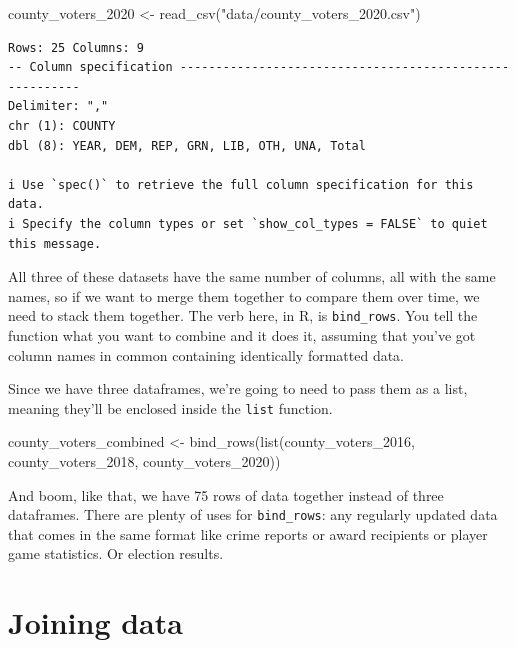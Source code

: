 \documentclass[
  letterpaper,
  DIV=11,
  numbers=noendperiod]{scrreprt}
\newenvironment{Shaded}{\begin{snugshade}}{\end{snugshade}}
\newcommand{\FunctionTok}[1]{\textcolor[rgb]{0.28,0.35,0.67}{#1}}
\newcommand{\NormalTok}[1]{\textcolor[rgb]{0.00,0.23,0.31}{#1}}
\newcommand{\OtherTok}[1]{\textcolor[rgb]{0.00,0.23,0.31}{#1}}
\newcommand{\StringTok}[1]{\textcolor[rgb]{0.13,0.47,0.30}{#1}}
\begin{document}
\begin{Shaded}
\begin{Highlighting}[]
\NormalTok{county\_voters\_2020 }\OtherTok{\textless{}{-}} \FunctionTok{read\_csv}\NormalTok{(}\StringTok{"data/county\_voters\_2020.csv"}\NormalTok{)}
\end{Highlighting}
\end{Shaded}

\begin{verbatim}
Rows: 25 Columns: 9
-- Column specification --------------------------------------------------------
Delimiter: ","
chr (1): COUNTY
dbl (8): YEAR, DEM, REP, GRN, LIB, OTH, UNA, Total

i Use `spec()` to retrieve the full column specification for this data.
i Specify the column types or set `show_col_types = FALSE` to quiet this message.
\end{verbatim}

All three of these datasets have the same number of columns, all with
the same names, so if we want to merge them together to compare them
over time, we need to stack them together. The verb here, in R, is
\texttt{bind\_rows}. You tell the function what you want to combine and
it does it, assuming that you've got column names in common containing
identically formatted data.

Since we have three dataframes, we're going to need to pass them as a
list, meaning they'll be enclosed inside the \texttt{list} function.

\begin{Shaded}
\begin{Highlighting}[]
\NormalTok{county\_voters\_combined }\OtherTok{\textless{}{-}} \FunctionTok{bind\_rows}\NormalTok{(}\FunctionTok{list}\NormalTok{(county\_voters\_2016, county\_voters\_2018, county\_voters\_2020))}
\end{Highlighting}
\end{Shaded}

And boom, like that, we have 75 rows of data together instead of three
dataframes. There are plenty of uses for \texttt{bind\_rows}: any
regularly updated data that comes in the same format like crime reports
or award recipients or player game statistics. Or election results.

\hypertarget{joining-data}{%
\section{Joining data}\label{joining-data}}
\end{document}
